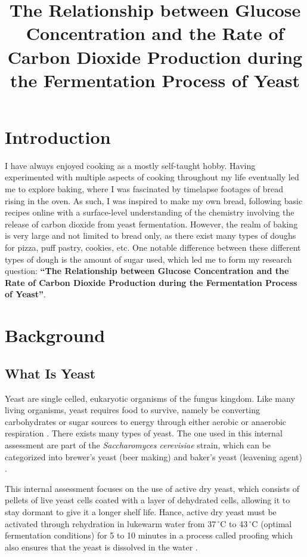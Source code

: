 \documentclass[12pt]{article}
\title{\textbf{The Relationship between Glucose Concentration and the Rate of Carbon Dioxide Production during the Fermentation Process of Yeast}}
\author{}
\date{}
\begin{document}
\maketitle
\newpage
{}

\section{Introduction}
I have always enjoyed cooking as a mostly self-taught hobby. Having experimented with multiple aspects of cooking throughout my life eventually led me to explore baking, where I was fascinated by timelapse footages of bread rising in the oven. As such, I was inspired to make my own bread, following basic recipes online with a surface-level understanding of the chemistry involving the release of carbon dioxide from yeast fermentation. However, the realm of baking is very large and not limited to bread only, as there exist many types of doughs for pizza, puff pastry, cookies, etc. One notable difference between these different types of dough is the amount of sugar used, which led me to form my research question: \textbf{``The Relationship between Glucose Concentration and the Rate of Carbon Dioxide Production during the Fermentation Process of Yeast''}.

\section{Background}

\subsection{What Is Yeast}
Yeast are single celled, eukaryotic organisms of the fungus kingdom. Like many living organisms, yeast requires food to survive, namely be converting carbohydrates or sugar sources to energy through either aerobic or anaerobic respiration \parencite{ref}. There exists many types of yeast. The one used in this internal assessment are part of the \emph{Saccharomyces cerevisiae} strain, which can be categorized into brewer's yeast (beer making) and baker's yeast (leavening agent) \parencite{ref}.

\medskip

This internal assessment focuses on the use of active dry yeast, which consists of pellets of live yeast cells coated with a layer of dehydrated cells, \parencite{ref} allowing it to stay dormant to give it a longer shelf life. Hance, active dry yeast must be activated through rehydration in lukewarm water from 37$\,^{\circ}$C to 43$\,^{\circ}$C (optimal fermentation conditions) for 5 to 10 minutes in a process called proofing which also ensures that the yeast is dissolved in the water \parencite{ref}.
\end{document}
